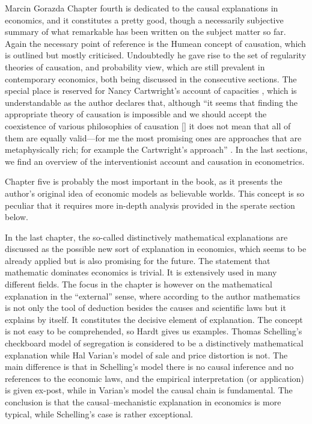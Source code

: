\begin{recengenv}{Marcin Gorazda}
Chapter fourth is dedicated to the causal explanations in economics, and it constitutes a pretty good, though a
necessarily subjective summary of what remarkable has been written on the subject matter so far. Again the necessary
point of reference is the Humean concept of causation, which is outlined but mostly criticised. Undoubtedly he gave
rise to the set of regularity theories of causation, and probability view, which are still prevalent in contemporary
economics, both being discussed in the consecutive sections. The special place is reserved for Nancy Cartwright’s
account of capacities
\parencite*{cartwright_dappled_1999},
which is understandable as the author declares that,
although ``\mydots it seems that finding the appropriate theory of causation is impossible and we should accept the coexistence
of various philosophies of causation [\mydots] it does not mean that all of them are equally valid—for me the most
promising ones are approaches that are metaphysically rich; for example the Cartwright’s approach''
\parencite[p.118]{hardt_economics_2017}.
In the last sections, we find an overview of the interventionist account
and causation in econometrics. 

Chapter five is probably the most important in the book, as it presents the author’s original idea of economic models as
believable worlds. This concept is so peculiar that it requires more in-depth analysis provided in the sperate section
below.


In the last chapter, the so-called distinctively mathematical explanations are discussed as the possible new sort of
explanation in economics, which seems to be already applied but is also promising for the future. The statement that
mathematic dominates economics is trivial. It is extensively used in many different fields. The focus in the chapter is
however on the mathematical explanation in the ``external'' sense, where according to the author mathematics is not only
the tool of deduction besides the causes and scientific laws but it explains by itself. It constitutes the decisive
element of explanation. The concept is not easy to be comprehended, so Hardt gives us examples. Thomas Schelling’s
checkboard model of segregation is considered to be a distinctively mathematical explanation while Hal Varian’s model
of sale and price distortion is not. The main difference is that in Schelling’s model there is no causal inference and
no references to the economic laws, and the empirical interpretation (or application) is given ex-post, while in
Varian’s model the causal chain is fundamental. The conclusion is that the causal–mechanistic explanation in economics
is more typical, while Schelling’s case is rather exceptional. 


\end{recengenv}
